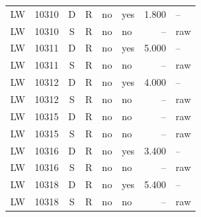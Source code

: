 \begin{longtable}{@{}llclllrl@{}}
LW & 10310 & D & R & no & yes & 1.800 & --\\
LW & 10310 & S & R & no & no & -- & raw\\
LW & 10311 & D & R & no & yes & 5.000 & --\\
LW & 10311 & S & R & no & no & -- & raw\\
LW & 10312 & D & R & no & yes & 4.000 & --\\
LW & 10312 & S & R & no & no & -- & raw\\
LW & 10315 & D & R & no & no & -- & raw\\
LW & 10315 & S & R & no & no & -- & raw\\
LW & 10316 & D & R & no & yes & 3.400 & --\\
LW & 10316 & S & R & no & no & -- & raw\\
LW & 10318 & D & R & no & yes & 5.400 & --\\
LW & 10318 & S & R & no & no & -- & raw\\
\end{longtable}\endgroup
